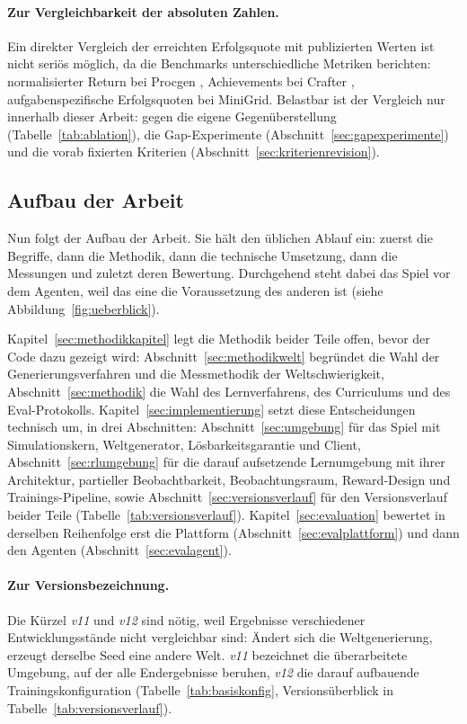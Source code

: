 \documentclass[11pt,a4paper]{article}
\begin{document}
\paragraph{Zur Vergleichbarkeit der absoluten Zahlen.}
Ein direkter Vergleich der erreichten Erfolgsquote mit publizierten Werten
ist nicht seriös möglich, da die Benchmarks unterschiedliche Metriken
berichten: normalisierter Return bei Procgen \cite{cobbe2020procgen},
Achievements bei Crafter \cite{hafner2021crafter}, aufgabenspezifische
Erfolgsquoten bei MiniGrid. Belastbar ist der Vergleich nur innerhalb
dieser Arbeit: gegen die eigene Gegenüberstellung (Tabelle~\ref{tab:ablation}),
die Gap-Experimente (Abschnitt~\ref{sec:gapexperimente}) und die vorab
fixierten Kriterien (Abschnitt~\ref{sec:kriterienrevision}).

\subsection{Aufbau der Arbeit}
\label{sec:aufbau}

Nun folgt der Aufbau der Arbeit. Sie hält den üblichen Ablauf ein: zuerst die
Begriffe, dann die Methodik, dann die technische Umsetzung, dann die
Messungen und zuletzt deren Bewertung. Durchgehend steht dabei das Spiel vor
dem Agenten, weil das eine die Voraussetzung des anderen ist (siehe
Abbildung~\ref{fig:ueberblick}).

Kapitel~\ref{sec:methodikkapitel} legt die Methodik beider Teile offen, bevor
der Code dazu gezeigt wird: Abschnitt~\ref{sec:methodikwelt} begründet die
Wahl der Generierungsverfahren und die Messmethodik der Weltschwierigkeit,
Abschnitt~\ref{sec:methodik} die Wahl des Lernverfahrens, des Curriculums und
des Eval-Protokolls. Kapitel~\ref{sec:implementierung} setzt diese
Entscheidungen technisch um, in drei Abschnitten:
Abschnitt~\ref{sec:umgebung} für das Spiel mit Simulationskern,
Weltgenerator, Lösbarkeitsgarantie und Client, Abschnitt~\ref{sec:rlumgebung}
für die darauf aufsetzende Lernumgebung mit ihrer Architektur, partieller
Beobachtbarkeit, Beobachtungsraum, Reward-Design und Trainings-Pipeline,
sowie Abschnitt~\ref{sec:versionsverlauf} für den Versionsverlauf beider
Teile (Tabelle~\ref{tab:versionsverlauf}). Kapitel~\ref{sec:evaluation}
bewertet in derselben Reihenfolge erst die Plattform
(Abschnitt~\ref{sec:evalplattform}) und dann den Agenten
(Abschnitt~\ref{sec:evalagent}).

\paragraph{Zur Versionsbezeichnung.}
Die Kürzel \emph{v11} und \emph{v12} sind nötig, weil Ergebnisse verschiedener
Entwicklungsstände nicht vergleichbar sind: Ändert sich die Weltgenerierung,
erzeugt derselbe Seed eine andere Welt. \emph{v11} bezeichnet die überarbeitete
Umgebung, auf der alle Endergebnisse beruhen, \emph{v12} die darauf aufbauende
Trainingskonfiguration (Tabelle~\ref{tab:basiskonfig}, Versionsüberblick in
Tabelle~\ref{tab:versionsverlauf}).
\end{document}

